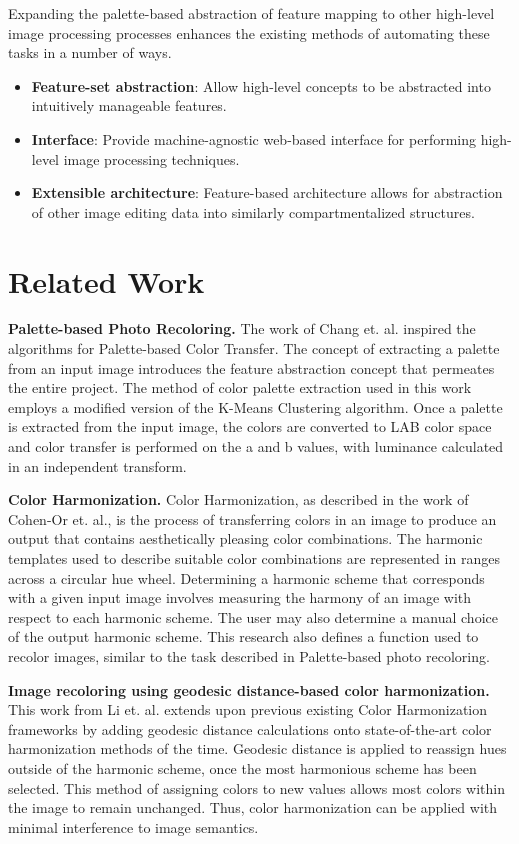 \documentclass[sigchi]{acmart}
\begin{document}
Expanding the palette-based abstraction of feature mapping to other high-level image processing processes enhances the existing methods of automating these tasks in a number of ways.

\begin{itemize}
	\item{\textbf{Feature-set abstraction}}: Allow high-level concepts to be abstracted into intuitively manageable features.
	\item{\textbf{Interface}}: Provide machine-agnostic web-based interface for performing high-level image processing techniques.
	\item{\textbf{Extensible architecture}}: Feature-based architecture allows for abstraction of other image editing data into similarly compartmentalized structures.
\end{itemize}

\section{Related Work}
\noindent\textbf{Palette-based Photo Recoloring.} The work of Chang et. al. inspired the algorithms for Palette-based Color Transfer. The concept of extracting a palette from an input image introduces the feature abstraction concept that permeates the entire project. The method of color palette extraction used in this work employs a modified version of the K-Means Clustering algorithm. Once a palette is extracted from the input image, the colors are converted to LAB color space and color transfer is performed on the a and b values, with luminance calculated in an independent transform. 
\linebreak

\noindent\textbf{Color Harmonization.} Color Harmonization, as described in the work of Cohen-Or et. al., is the process of transferring colors in an image to produce an output that contains aesthetically pleasing color combinations. The harmonic templates used to describe suitable color combinations are represented in ranges across a circular hue wheel. Determining a harmonic scheme that corresponds with a given input image involves measuring the harmony of an image with respect to each harmonic scheme. The user may also determine a manual choice of the output harmonic scheme. This research also defines a function used to recolor images, similar to the task described in Palette-based photo recoloring.
\linebreak

\noindent\textbf{Image recoloring using geodesic distance-based color harmonization.} This work from Li et. al. extends upon previous existing Color Harmonization frameworks by adding geodesic distance calculations onto state-of-the-art color harmonization methods of the time. Geodesic distance is applied to reassign hues outside of the harmonic scheme, once the most harmonious scheme has been selected. This method of assigning colors to new values allows most colors within the image to remain unchanged. Thus, color harmonization can be applied with minimal interference to image semantics.
\linebreak
\end{document}
